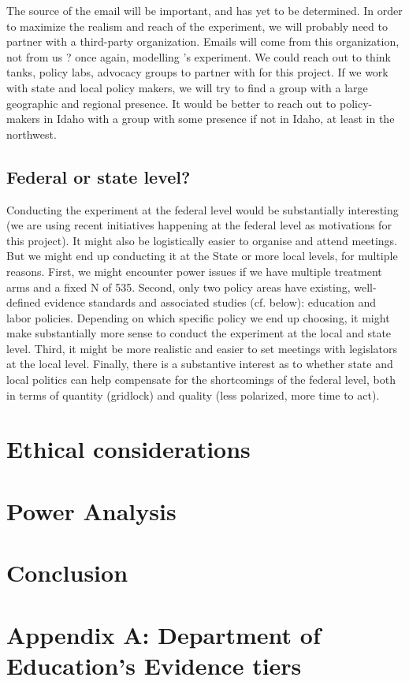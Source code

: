 \documentclass[12pt,final,fleqn]{article}
\theoremstyle{plain}
\begin{document}
The source of the email will be important, and has yet to be determined. In order to maximize the realism and reach of the experiment, we will probably need to partner with a third-party organization. Emails will come from this organization, not from us ? once again, modelling \citet{kalla2016campaign}'s experiment. We could reach out to think tanks, policy labs, advocacy groups to partner with for this project. If we work with state and local policy makers, we will try to find a group with a large geographic and regional presence. It would be better to reach out to policy-makers in Idaho with a group with some presence if not in Idaho, at least in the northwest. 

\subsection{Federal or state level?} \label{sec: Level}

Conducting the experiment at the federal level would be substantially interesting (we are using recent initiatives happening at the federal level as motivations for this project). It might also be logistically easier to organise and attend meetings. But we might end up conducting it at the State or more local levels, for multiple reasons. First, we might encounter power issues if we have multiple treatment arms and a fixed N of 535. Second, only two policy areas have existing, well-defined evidence standards and associated studies (cf. below): education and labor policies. Depending on which specific policy we end up choosing, it might make substantially more sense to conduct the experiment at the local and state level. Third, it might be more realistic and easier to set meetings with legislators at the local level. Finally, there is a substantive interest as to whether state and local politics can help compensate for the shortcomings of the federal level, both in terms of quantity (gridlock) and quality (less polarized, more time to act). 


\section{Ethical considerations} \label{sec:Ethics}



\section{Power Analysis} \label{sec:Power}


\section{Conclusion} \label{sec:Conclusion}


\clearpage
\pagebreak


\pagebreak

\section{Appendix A: Department of Education's Evidence tiers} \label{sec: DoE}
\end{document}
